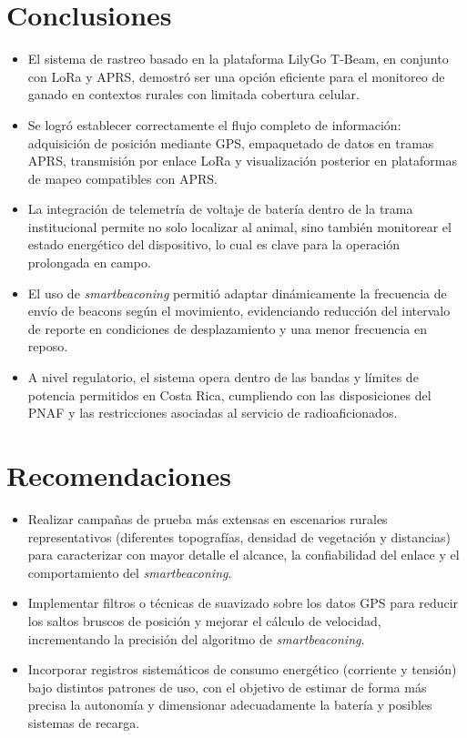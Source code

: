 \documentclass[journal]{IEEEtran}
\begin{document}
\section{Conclusiones}
\begin{itemize}
    \item El sistema de rastreo basado en la plataforma LilyGo T-Beam, en conjunto con LoRa y APRS, demostró ser una opción eficiente para el monitoreo de ganado en contextos rurales con limitada cobertura celular.
    \item Se logró establecer correctamente el flujo completo de información: adquisición de posición mediante GPS, empaquetado de datos en tramas APRS, transmisión por enlace LoRa y visualización posterior en plataformas de mapeo compatibles con APRS.
    \item La integración de telemetría de voltaje de batería dentro de la trama institucional permite no solo localizar al animal, sino también monitorear el estado energético del dispositivo, lo cual es clave para la operación prolongada en campo.
    \item El uso de \textit{smartbeaconing} permitió adaptar dinámicamente la frecuencia de envío de beacons según el movimiento, evidenciando reducción del intervalo de reporte en condiciones de desplazamiento y una menor frecuencia en reposo.
    \item A nivel regulatorio, el sistema opera dentro de las bandas y límites de potencia permitidos en Costa Rica, cumpliendo con las disposiciones del PNAF y las restricciones asociadas al servicio de radioaficionados.

\end{itemize}

\section{Recomendaciones}
\begin{itemize}
    \item Realizar campañas de prueba más extensas en escenarios rurales representativos (diferentes topografías, densidad de vegetación y distancias) para caracterizar con mayor detalle el alcance, la confiabilidad del enlace y el comportamiento del \textit{smartbeaconing}.
    \item Implementar filtros o técnicas de suavizado sobre los datos GPS para reducir los saltos bruscos de posición y mejorar el cálculo de velocidad, incrementando la precisión del algoritmo de \textit{smartbeaconing}.
    \item Incorporar registros sistemáticos de consumo energético (corriente y tensión) bajo distintos patrones de uso, con el objetivo de estimar de forma más precisa la autonomía y dimensionar adecuadamente la batería y posibles sistemas de recarga.
\end{itemize}
\end{document}
